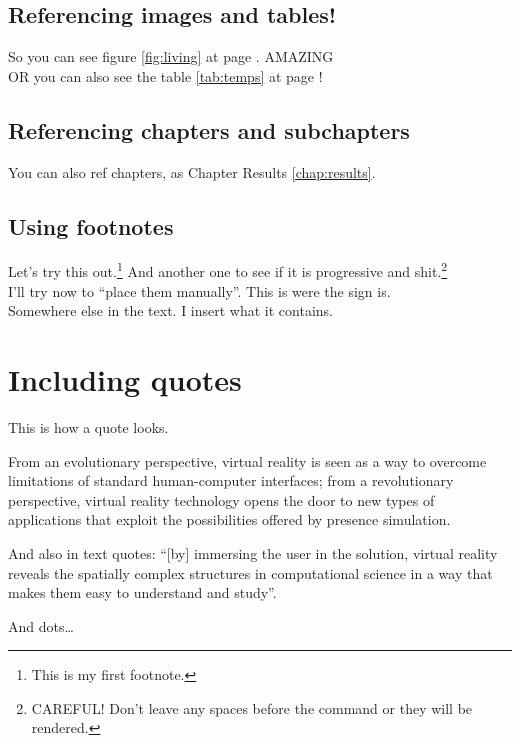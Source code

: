 
\subsection{Referencing images and tables!}
So you can see figure \ref{fig:living} at page \pageref{living}. AMAZING\\
OR you can also see the table \ref{tab:temps} at page \pageref{tab:temps}!

\subsection{Referencing chapters and subchapters}
You can also ref chapters, as Chapter Results \ref{chap:results}.

\subsection{Using footnotes}
Let's try this out.\footnote{This is my first footnote.} And another one to see if it is progressive and shit.\footnote{CAREFUL! Don't leave any spaces before the command or they will be rendered.}\\

I'll try now to ``place them manually''. This is were the sign is.\footnotemark \\
Somewhere else in the text. I insert what it contains.

\section{Including quotes}
This is how a quote looks. 

\begin{displayquote}
	From an evolutionary perspective, virtual reality is seen as a way to overcome limitations of standard human-computer interfaces; from a revolutionary perspective, virtual reality technology opens the door to new types of applications that exploit the possibilities offered by presence simulation.
\end{displayquote}

And also in text quotes: \enquote{[by] immersing the user in the solution, virtual reality reveals the spatially complex structures in computational science in a way that makes them easy to understand and study}.

And dots\dots

